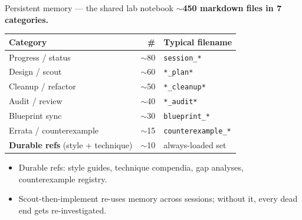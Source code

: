 \documentclass[aspectratio=169,10pt]{beamer}
\begin{document}
\begin{frame}{Persistent memory --- the shared lab notebook}
    \textcolor{leangreen}{\textbf{$\sim$450 markdown files in 7 categories.}}
    \vspace{0.3em}
    \begin{center}
    {\footnotesize
    \begin{tabular}{@{}l r l@{}}
        \toprule
        Category & \# & Typical filename \\
        \midrule
        Progress / status        & $\sim$80 & \texttt{session\_*} \\
        Design / scout           & $\sim$60 & \texttt{*\_plan*} \\
        Cleanup / refactor       & $\sim$50 & \texttt{*\_cleanup*} \\
        Audit / review           & $\sim$40 & \texttt{*\_audit*} \\
        Blueprint sync           & $\sim$30 & \texttt{blueprint\_*} \\
        Errata / counterexample  & $\sim$15 & \texttt{counterexample\_*} \\
        \textbf{Durable refs} (style + technique) & $\sim$10 & always-loaded set \\
        \bottomrule
    \end{tabular}}
    \end{center}
    \vspace{0.4em}
    \begin{itemize}
        \item Durable refs: style guides, technique compendia, gap analyses, counterexample registry.
        \item Scout-then-implement re-uses memory across sessions; without it, every dead end gets re-investigated.
    \end{itemize}
\end{frame}
\end{document}
